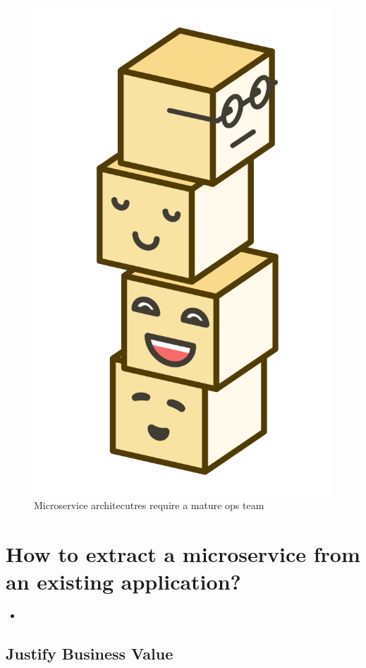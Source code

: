 \begin{figure}[ht]
  \centering
  \includegraphics[width=0.25\linewidth]{assets/illustration-microservice-stack.png}
  \caption{Microservice architecutres require a mature ops team}
\end{figure}







\section{How to extract a microservice from an existing application?}

\begin{itemize}
  \item {}
\end{itemize}


\subsection{Justify Business Value}

